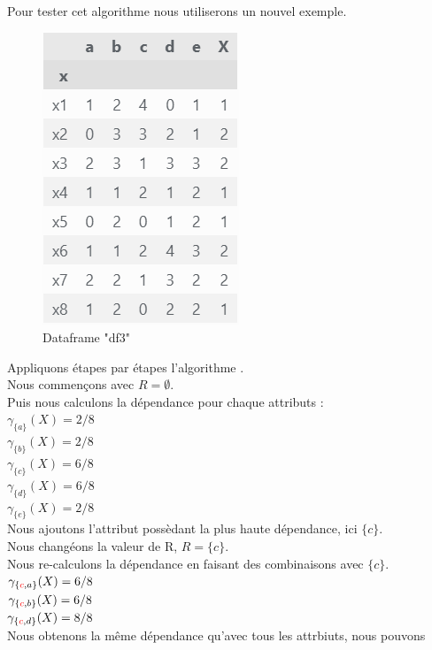 \subsubsection{\quickreduct}
Pour tester cet algorithme nous utiliserons un nouvel exemple. \\
\begin{figure}[h!]
	\centering
	\includegraphics[scale=0.8]{img/df_exemple_3.PNG}
	\caption{Dataframe "df3"}
	\label{fig:df_exemple_3}
\end{figure}
Appliquons étapes par étapes l'algorithme \quickreduct.\\
Nous commençons avec $R = \emptyset $.\\
Puis nous calculons la dépendance pour chaque attributs :\\
$\gamma_{\{a\}}(X) = 2/8$ \\
$\gamma_{\{b\}}(X) = 2/8$ \\
$\gamma_{\{c\}}(X) = 6/8$ \\
$\gamma_{\{d\}}(X) = 6/8$ \\
$\gamma_{\{e\}}(X) = 2/8$ \\
Nous ajoutons l'attribut possèdant la plus haute dépendance, ici $\{c\}$. \\
Nous changéons la valeur de R, $R = \{c\}$. \\
Nous re-calculons la dépendance en faisant des combinaisons avec $\{c\}$. \\
$\gamma_{\{\textcolor{red}{c},a\}}(X) = 6/8$ \\
$\gamma_{\{\textcolor{red}{c},b\}}(X) = 6/8$ \\
$\gamma_{\{\textcolor{red}{c},d\}}(X) = 8/8$ \\
Nous obtenons la même dépendance qu'avec tous les attrbiuts, nous pouvons
